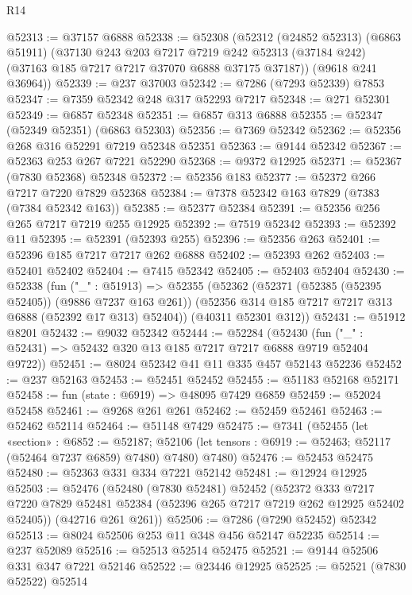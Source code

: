 \begin{lexlean}{R14}
\begin{coremodule}
@52313 := @37157 @6888
@52338 := @52308
    (@52312
      (@24852 @52313)
      (@6863 @51911)
      (@37130
        @243
        @203
        @7217
        @7219
        @242
        @52313
        (@37184 @242)
        (@37163 @185 @7217 @7217 @37070 @6888 @37175 @37187))
      (@9618 @241 @36964))
@52339 := @237 @37003
@52342 := @7286 (@7293 @52339) @7853
@52347 := @7359 @52342 @248 @317 @52293 @7217
@52348 := @271 @52301
@52349 := @6857 @52348
@52351 := @6857 @313 @6888
@52355 := @52347 (@52349 @52351) (@6863 @52303)
@52356 := @7369 @52342
@52362 := @52356 @268 @316 @52291 @7219 @52348 @52351
@52363 := @9144 @52342
@52367 := @52363 @253 @267 @7221 @52290
@52368 := @9372 @12925
@52371 := @52367 (@7830 @52368) @52348
@52372 := @52356 @183
@52377 := @52372 @266 @7217 @7220 @7829 @52368
@52384 := @7378 @52342 @163 @7829 (@7383 (@7384 @52342 @163))
@52385 := @52377 @52384
@52391 := @52356 @256 @265 @7217 @7219 @255 @12925
@52392 := @7519 @52342
@52393 := @52392 @11
@52395 := @52391 (@52393 @255)
@52396 := @52356 @263
@52401 := @52396 @185 @7217 @7217 @262 @6888
@52402 := @52393 @262
@52403 := @52401 @52402
@52404 := @7415 @52342
@52405 := @52403 @52404
@52430 := @52338
    (fun ("_" : @51913) =>
    @52355
      (@52362
        (@52371 (@52385 (@52395 @52405)) (@9886 @7237 @163 @261))
        (@52356 @314 @185 @7217 @7217 @313 @6888 (@52392 @17 @313) @52404))
      (@40311 @52301 @312))
@52431 := @51912 @8201
@52432 := @9032 @52342
@52444 := @52284
    (@52430 (fun ("_" : @52431) => @52432 @320 @13 @185 @7217 @7217 @6888 @9719 @52404 @9722))
@52451 := @8024 @52342 @41 @11 @335 @457 @52143 @52236
@52452 := @237 @52163
@52453 := @52451 @52452
@52455 := @51183 @52168 @52171
@52458 := fun (state : @6919) => @48095 @7429 @6859
@52459 := @52024 @52458
@52461 := @9268 @261 @261
@52462 := @52459 @52461
@52463 := @52462 @52114
@52464 := @51148 @7429
@52475 := @7341
    (@52455
      (let «section» : @6852 := @52187;
      @52106 (let tensors : @6919 := @52463; @52117 (@52464 @7237 @6859) @7480) @7480)
      @7480)
@52476 := @52453 @52475
@52480 := @52363 @331 @334 @7221 @52142
@52481 := @12924 @12925
@52503 := @52476
    (@52480
      (@7830 @52481)
      @52452
      (@52372
        @333
        @7217
        @7220
        @7829
        @52481
        @52384
        (@52396 @265 @7217 @7219 @262 @12925 @52402 @52405))
      (@42716 @261 @261))
@52506 := @7286 (@7290 @52452) @52342
@52513 := @8024 @52506 @253 @11 @348 @456 @52147 @52235
@52514 := @237 @52089
@52516 := @52513 @52514 @52475
@52521 := @9144 @52506 @331 @347 @7221 @52146
@52522 := @23446 @12925
@52525 := @52521 (@7830 @52522) @52514

\end{coremodule}
\end{lexlean}
